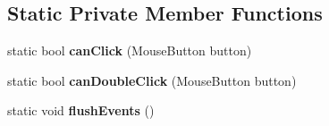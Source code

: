 \subsection*{Static Private Member Functions}
\begin{DoxyCompactItemize}
\item 
\mbox{\label{class_n_g_sim_1_1_input_1_1_input_manager_a28978bd0a673c68b0c97de7787093918}} 
static bool {\bfseries can\+Click} (Mouse\+Button button)
\item 
\mbox{\label{class_n_g_sim_1_1_input_1_1_input_manager_a73a0cdc13e0ac106a88f19e5ebe31e57}} 
static bool {\bfseries can\+Double\+Click} (Mouse\+Button button)
\item 
\mbox{\label{class_n_g_sim_1_1_input_1_1_input_manager_afd9b04ccaeed60566c4f46e0036413a4}} 
static void {\bfseries flush\+Events} ()
\end{DoxyCompactItemize}
